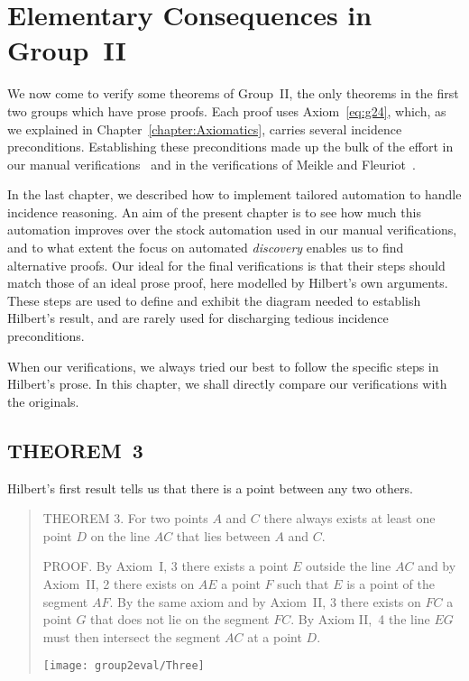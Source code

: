 \chapter{Elementary Consequences in Group~II}\label{chapter:Group2Eval}
We now come to verify some theorems of Group~II, the only theorems in the first two groups which have prose proofs. Each proof uses Axiom~\ref{eq:g24}, which, as we explained in Chapter~\ref{chapter:Axiomatics}, carries several incidence preconditions. Establishing these preconditions made up the bulk of the effort in our manual verifications~\cite{ScottMScThesis} and in the verifications of Meikle and Fleuriot~\cite{MeikleFleuriotFormalizingHilbert}.

In the last chapter, we described how to implement tailored automation to handle incidence reasoning. An aim of the present chapter is to see how much this automation improves over the stock automation used in our manual verifications, and to what extent the focus on automated \emph{discovery} enables us to find alternative proofs. Our ideal for the final verifications is that their steps should match those of an ideal prose proof, here modelled by Hilbert's own arguments. These steps are used to define and exhibit the diagram needed to establish Hilbert's result, and are rarely used for discharging tedious incidence preconditions.

When our verifications, we always tried our best to follow the specific steps in Hilbert's prose. In this chapter, we shall directly compare our verifications with the originals.

\section{THEOREM~3}\label{sec:Theorem3}
Hilbert's first result tells us that there is a point between any two others.

\begin{quotation}
THEOREM 3. For two points $A$ and $C$ there always exists at least one point $D$ on the line $AC$ that lies between $A$ and $C$.

PROOF. By Axiom~I, 3 there exists a point $E$ outside the line $AC$ and by Axiom~II, 2 there exists on $AE$ a point $F$ such that $E$ is a point of the segment $AF$. By the same axiom and by Axiom~II, 3 there exists on $FC$ a point $G$ that does not lie on the segment $FC$. By Axiom II,~4 the line $EG$ must then intersect the segment $AC$ at a point $D$.

\vspace{0.5cm}
\centering\texttt{[image: group2eval/Three]}
\end{quotation}

